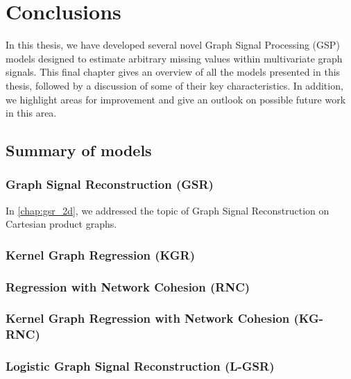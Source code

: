 \chapter{Conclusions} %

\label{chap:conclusions} %


In this thesis, we have developed several novel Graph Signal Processing (GSP) models designed to estimate arbitrary missing values within multivariate graph signals. This final chapter gives an overview of all the models presented in this thesis, followed by a discussion of some of their key characteristics. In addition, we highlight areas for improvement and give an outlook on possible future work in this area. 

\section{Summary of models}

\subsection*{Graph Signal Reconstruction (GSR)}

In \cref{chap:gsr_2d}, we addressed the topic of Graph Signal Reconstruction on Cartesian product graphs. 

\subsection*{Kernel Graph Regression (KGR)}

\subsection*{Regression with Network Cohesion (RNC)}

\subsection*{Kernel Graph Regression with Network Cohesion (KG-RNC)}

\subsection*{Logistic Graph Signal Reconstruction (L-GSR)}

